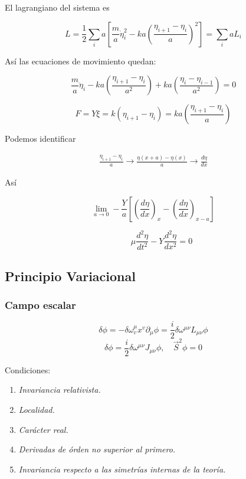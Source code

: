 \documentclass{article}
\begin{document}
El lagrangiano del sistema es

$$
{ L=\frac{1}{2} \sum_{i} a\left[\frac{m}{a} \dot{\eta}_{i}^{2}-k a\left(\frac{\eta_{i+1}-\eta_{i}}{a}\right)^{2}\right]=\sum_{i} a L_{i}}
$$

Así las ecuaciones de movimiento quedan:

$$
{ \frac{m}{a} \ddot{\eta}_{i}-k a\left(\frac{\eta_{i+1}-\eta_{i}}{a^{2}}\right)+k a\left(\frac{\eta_{i}-\eta_{i-1}}{a^{2}}\right)=0}
$$

$$
F=Y\xi=k\left(\eta_{i+1}-\eta_{i}\right)=k a\left(\frac{\eta_{i+1}-\eta_{i}}{a}\right)
$$

Podemos identificar

$$
\begin{array}{l}{\frac{\eta_{i+1}-\eta_{i}}{a} \rightarrow \frac{\eta(x+a)-\eta(x)}{a}} \rightarrow {\frac{d \eta}{d x}}\end{array}
$$

Así

$$
{\lim _{a \rightarrow 0}-\frac{Y}{a}\left[\left(\frac{d \eta}{d x}\right)_{x}-\left(\frac{d \eta}{d x}\right)_{x-a}\right]}
$$

$$
{\qquad \mu \frac{d^{2} \eta}{d t^{2}}-Y \frac{d^{2} \eta}{d x^{2}}=0}
$$

\subsection{Principio Variacional}

\subsubsection{Campo escalar}
$$
\delta \phi=-\delta \omega_{v}^{\mu} x^{v} \partial_{\mu} \phi=\frac{i}{2} \delta \omega^{\mu \nu} L_{\mu \nu} \phi
$$
$$
\delta \phi=\frac{i}{2} \delta \omega^{\mu \nu} J_{\mu \nu} \phi, \quad \vec{S}^{2} \phi=0
$$

Condiciones:
\begin{enumerate}
    \item \textit{Invariancia relativista.}
    \item \textit{Localidad.}
    \item \textit{Carácter real.}
    \item \textit{Derivadas de órden no superior al primero.}
    \item \textit{Invariancia respecto a las simetrías internas de la teoría.}
\end{enumerate}
\end{document}
